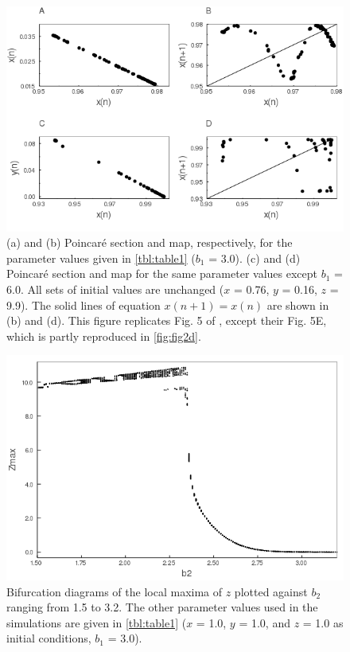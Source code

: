 \newpage

\begin{figure}
  \centering
  \includegraphics[scale=0.7]{figures/fig5.png}
  \caption{(a) and (b) Poincaré section and map, respectively, for the parameter values given in \autoref{tbl:table1} ($b_1$ = 3.0).  (c) and (d) Poincaré section and map for the same parameter values except $b_1$ = 6.0. All sets of initial values are unchanged ($x$ = 0.76, $y$ = 0.16, $z$ = 9.9). The solid lines of equation $x(n+1) = x(n)$ are shown in (b) and (d). This figure replicates Fig. 5 of \citet{hastings1991}, except their Fig. 5E, which is partly reproduced in \autoref{fig:fig2d}.}
  \label{fig:fig5}
\end{figure}

\newpage

\begin{figure}
  \centering
  \includegraphics[scale=0.7]{figures/figS1.png}
  \caption{Bifurcation diagrams of the local maxima of $z$ plotted against $b_2$ ranging from 1.5 to 3.2. The other parameter values used in the simulations are given in \autoref{tbl:table1} ($x$ = 1.0, $y$ = 1.0, and $z$ = 1.0 as initial conditions, $b_1$ = 3.0).}
  \label{fig:figS1}
\end{figure}
